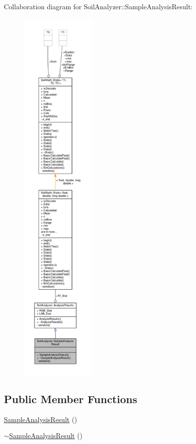 Collaboration diagram for Soil\+Analyzer\+:\+:Sample\+Analysis\+Result\+:\nopagebreak
\begin{figure}[H]
\begin{center}
\leavevmode
\includegraphics[height=550pt]{class_soil_analyzer_1_1_sample_analysis_result__coll__graph}
\end{center}
\end{figure}
\subsection*{Public Member Functions}
\begin{DoxyCompactItemize}
\item 
\hyperlink{class_soil_analyzer_1_1_sample_analysis_result_acc4ed05ba31712e12c498c2f52a518ab}{Sample\+Analysis\+Result} ()
\item 
\hyperlink{class_soil_analyzer_1_1_sample_analysis_result_a84231772d093a0189ca29d0f07ae7d20}{$\sim$\+Sample\+Analysis\+Result} ()
\end{DoxyCompactItemize}
